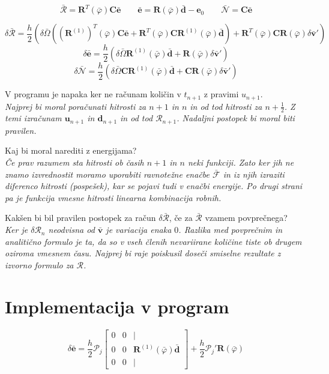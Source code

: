 \documentclass{article}
\newcommand{\dep}[1]{{\scriptstyle(#1)}}
\begin{document}
$$\bar{\mathcal{R}} = \mathbf{R}^T\dep{\bar{\varphi}}\mathbf{C}\bar{\mathbf{e}}  \qquad \bar{\mathbf{e}} = \mathbf{R}\dep{\bar{\varphi}}\bar{\mathbf{d}}-\mathbf{e}_0 \qquad \bar{\mathcal{N}} = \mathbf{C}\bar{\mathbf{e}}  $$

$$\delta \bar{\mathcal{R}} = \frac{h}{2} (\delta\bar{\Omega}((\mathbf{R}^{(1)})^T\dep{\bar{\varphi}}\mathbf{C}\bar{\mathbf{e}} + \mathbf{R}^T\dep{\bar{\varphi}}\mathbf{CR}^{(1)}\dep{\bar{\varphi}}\bar{\mathbf{d}}) + \mathbf{R}^T\dep{\bar{\varphi}} \mathbf{CR}\dep{\bar{\varphi}}\delta\bar{\mathbf{v}}' )$$
$$\delta\bar{\mathbf{e}} = \frac{h}{2}(\delta\bar{\Omega}\mathbf{R}^{(1)}\dep{\bar{\varphi}}\bar{\mathbf{d}} + \mathbf{R}\dep{\bar{\varphi}}\delta\bar{\mathbf{v}}')$$
$$\delta\bar{\mathcal{N}} = \frac{h}{2} (\delta\bar{\Omega}\mathbf{CR}^{(1)}\dep{\bar{\varphi}}\bar{\mathbf{d}} + \mathbf{CR}\dep{\bar{\varphi}}\delta\bar{\mathbf{v}}')$$


V programu je napaka ker ne računam količin v $t_{n+1}$ z pravimi $u_{n+1}$.\\
{\it Najprej bi moral poračunati hitrosti za $n+1$ in $n$ in od tod hitrosti za $n+\frac{1}{2}$. Z temi izračunam $\mathbf{u}_{n+1}$ in $\mathbf{d}_{n+1}$ in od tod $\mathcal{R}_{n+1}$. Nadaljni postopek bi moral biti pravilen.}

Kaj bi moral narediti z energijama?\\
{\it Če prav razumem sta hitrosti ob časih $n+1$ in $n$ neki funkciji. Zato ker jih ne znamo izvrednostit moramo uporabiti ravnotežne enačbe $\bar{\mathcal{F}}$ in iz njih izraziti diferenco hitrosti (pospešek), kar se pojavi tudi v enačbi energije. Po drugi strani pa je funkcija vmesne hitrosti linearna kombinacija robnih.}

Kakšen bi bil pravilen postopek za račun $\delta\bar{\mathcal{R}}$, če za $\bar{\mathcal{R}}$ vzamem povprečnega?\\
{\it Ker je $\delta\mathcal{R}_n$ neodvisna od $\bar{\mathbf{v}}$ je variacija enaka $0$. Razlika med povprečnim in analitično formulo je ta, da so v vseh členih nevariirane količine tiste ob drugem oziroma vmesnem času. Najprej bi raje poiskusil doseči smiselne rezultate z izvorno formulo za $\mathcal{R}$.}





\newpage
\section{Implementacija v program}
$$\delta\bar{\mathbf{e}} = \frac{h}{2}\mathcal{P}_j
\begin{bmatrix}
0 & 0 & | \\
	0 & 0 & \mathbf{R}^{(1)}\dep{\bar{\varphi}}\bar{\mathbf{d}} \\
0 & 0 & |
\end{bmatrix} + \frac{h}{2}\mathcal{P}_j' \mathbf{R}\dep{\bar{\varphi}}$$
\end{document}
